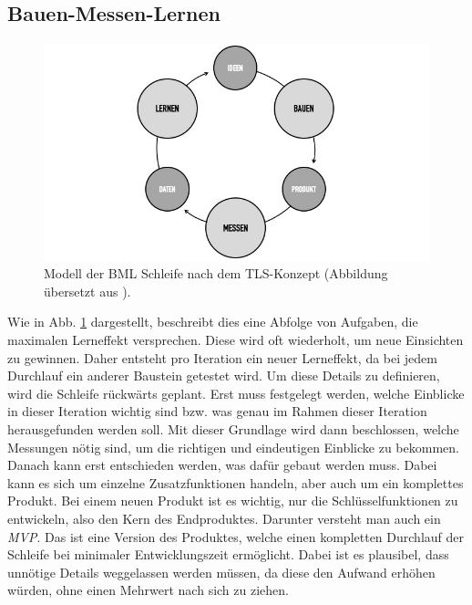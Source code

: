 \subsection*{\label{sec:LeanStartup-BML}\thesubsection\quad Bauen-Messen-Lernen}
\begin{figure}
	\begin{center}
		\includegraphics[scale=0.5]{99_IMG/02_Grundlagen/buildmeasurelearn.jpg}
		\caption[Modell der \ac{BML} Schleife nach dem \ac{TLS}-Konzept.]{Modell der \ac{BML} Schleife nach dem \ac{TLS}-Konzept (Abbildung übersetzt aus ).}
		\label{fig:LeanStartup_BuildMeasureLearn}
	\end{center}
\end{figure}
Wie in Abb. \ref{fig:LeanStartup_BuildMeasureLearn} dargestellt, beschreibt dies eine Abfolge von Aufgaben, die maximalen Lerneffekt versprechen. Diese wird oft wiederholt, um neue Einsichten zu gewinnen. Daher entsteht pro Iteration ein neuer Lerneffekt, da bei jedem Durchlauf ein anderer Baustein getestet wird. Um diese Details zu definieren, wird die Schleife rückwärts geplant. Erst muss festgelegt werden, welche Einblicke in dieser Iteration wichtig sind bzw. was genau im Rahmen dieser Iteration herausgefunden werden soll. Mit dieser Grundlage wird dann beschlossen, welche Messungen nötig sind, um die richtigen und eindeutigen Einblicke zu bekommen. Danach kann erst entschieden werden, was dafür gebaut werden muss. Dabei kann es sich um einzelne Zusatzfunktionen handeln, aber auch um ein komplettes Produkt. Bei einem neuen Produkt ist es wichtig, nur die Schlüsselfunktionen zu entwickeln, also den Kern des Endproduktes. Darunter versteht man auch ein \textit{\ac{MVP}}. Das ist eine Version des Produktes, welche einen kompletten Durchlauf der Schleife bei minimaler Entwicklungszeit ermöglicht. Dabei ist es plausibel, dass unnötige Details weggelassen werden müssen, da diese den Aufwand erhöhen würden, ohne einen Mehrwert nach sich zu ziehen.

